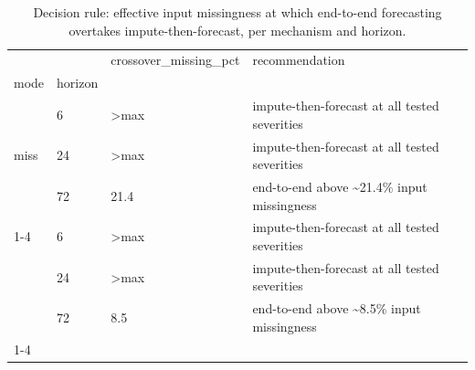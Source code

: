 \begin{table}
\caption{Decision rule: effective input missingness at which end-to-end forecasting overtakes impute-then-forecast, per mechanism and horizon.}
\label{tab:decision}
\begin{tabular}{llll}
\toprule
 &  & crossover\_missing\_pct & recommendation \\
mode & horizon &  &  \\
\midrule
\multirow[t]{3}{*}{miss} & 6 & >max & impute-then-forecast at all tested severities \\
 & 24 & >max & impute-then-forecast at all tested severities \\
 & 72 & 21.4 & end-to-end above \textasciitilde 21.4\% input missingness \\
\cline{1-4}
\multirow[t]{3}{*}{out} & 6 & >max & impute-then-forecast at all tested severities \\
 & 24 & >max & impute-then-forecast at all tested severities \\
 & 72 & 8.5 & end-to-end above \textasciitilde 8.5\% input missingness \\
\cline{1-4}
\bottomrule
\end{tabular}
\end{table}
